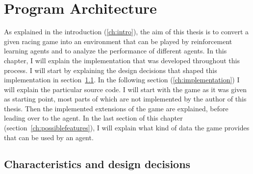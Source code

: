 \chapter{Program Architecture}

\label{ch:program}

\newcommand{\term}[1] {{\spaceskip=.95\fontdimen2\font minus \fontdimen4\font
	\xspaceskip=0pt\relax \large\texttt{#1}}}

\renewcommand{\inlinecode}[1]{\colorbox{red}{\lstinline[basicstyle=\ttfamily\color{black}]{#1}}}

\newcommand{\codefunc}[1]{\colorbox{evenmorelightgray}{\lstinline[basicstyle=\ttfamily\color{black}]{#1}}}

\newcommand{\codeobj}[1]{\colorbox{evenmorelightgray}{{\spaceskip=.95\fontdimen2\font minus \fontdimen4\font	\xspaceskip=0pt\relax \large\texttt{#1}}}}

\newcommand{\codeother}[1]{\colorbox{evenmorelightgray}{\lstinline[basicstyle=\ttfamily\color{black}]{#1}}}


\newcommand{\filename}[1] {{\spaceskip=.95\fontdimen2\font minus \fontdimen4\font
		\xspaceskip=0pt\relax \large\texttt{#1}}}


As explained in the introduction (\ref{ch:intro}), the aim of this thesis is to convert a given racing game into an environment that can be played by reinforcement learning agents and to analyze the performance of different agents. In this chapter, I will explain the implementation that was developed throughout this process. I will start by explaining the design decisions that shaped this implementation in section~\ref{ch:projectcharacteristicschap}. In the following section (\ref{ch:implementation}) I will explain the particular source code. I will start with the game as it was given as starting point, most parts of which are not implemented by the author of this thesis. Then the implemented extensions of the game are explained, before leading over to the agent. In the last section of this chapter (section~\ref{ch:possiblefeatures}), I will explain what kind of data the game provides that can be used by an agent.

\section{Characteristics and design decisions}

\label{ch:projectcharacteristicschap}

